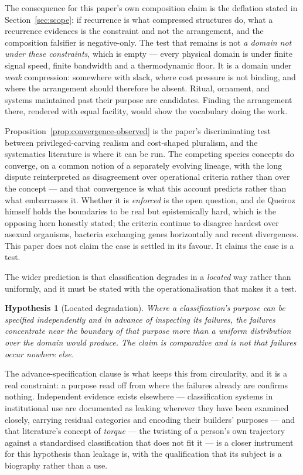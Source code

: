 \documentclass[11pt,a4paper]{article}
\newtheorem{hypothesis}[definition]{Hypothesis}
\theoremstyle{remark}\newtheorem{remark}[definition]{Remark}
\begin{document}
The consequence for this paper's own composition claim is the deflation stated in
Section~\ref{sec:scope}: if recurrence is what compressed structures do, what a recurrence evidences
is the constraint and not the arrangement, and the composition falsifier is negative-only. The test
that remains is not \emph{a domain not under these constraints}, which is empty --- every physical
domain is under finite signal speed, finite bandwidth and a thermodynamic floor. It is a domain under
\emph{weak} compression: somewhere with slack, where cost pressure is not binding, and where the
arrangement should therefore be absent. Ritual, ornament, and systems maintained past their purpose
are candidates. Finding the arrangement there, rendered with equal facility, would show the
vocabulary doing the work.

Proposition~\ref{prop:convergence-observed} is the paper's discriminating test between
privileged-carving realism and cost-shaped pluralism, and the systematics literature is where it can be run. The competing species
concepts do converge, on a common notion of a separately evolving lineage, with the long dispute
reinterpreted as disagreement over operational criteria rather than over the concept
\citep{dequeiroz2007} --- and that convergence is what this account predicts rather than what
embarrasses it. Whether it is \emph{enforced} is the open question, and de Queiroz himself holds the
boundaries to be real but epistemically hard, which is the opposing horn honestly stated; the
criteria continue to disagree hardest over asexual organisms, bacteria exchanging genes horizontally
and recent divergences. This paper does not claim the case is settled in its favour. It claims the
case is a test.

The wider prediction is that classification degrades in a \emph{located} way rather than uniformly,
and it must be stated with the operationalisation that makes it a test.

\begin{hypothesis}[Located degradation]\label{hyp:located-degradation}
Where a classification's purpose can be specified independently and in advance of inspecting its
failures, the failures concentrate near the boundary of that purpose more than a uniform
distribution over the domain would produce. The claim is comparative and is not that failures occur
nowhere else.
\end{hypothesis}

The advance-specification clause is what keeps this from circularity, and it is a real constraint: a
purpose read off from where the failures already are confirms nothing. Independent evidence exists
elsewhere --- classification systems in institutional use are documented as leaking wherever they
have been examined closely, carrying residual categories and encoding their builders' purposes
\citep{bowkerstar1999} --- and that literature's concept of \emph{torque} --- the twisting of a
person's own trajectory against a standardised classification that does not fit it --- is a closer
instrument for this hypothesis than leakage is, with the qualification that its subject is a
biography rather than a use.
\end{document}
